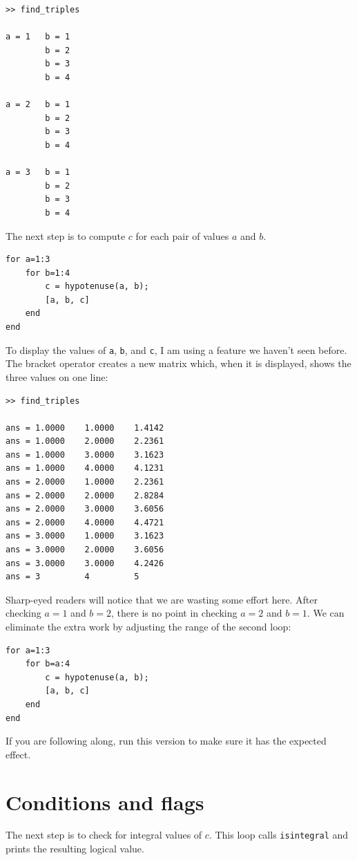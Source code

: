 \documentclass[
]{book}
\begin{document}
\begin{verbatim}
>> find_triples

a = 1   b = 1
        b = 2
        b = 3
        b = 4

a = 2   b = 1
        b = 2
        b = 3
        b = 4

a = 3   b = 1
        b = 2
        b = 3
        b = 4
\end{verbatim}

The next step is to compute $c$ for each pair of values $a$ and $b$.

\begin{verbatim}
for a=1:3
    for b=1:4
        c = hypotenuse(a, b);
        [a, b, c]
    end
end
\end{verbatim}

To display the values of {\tt a}, {\tt b}, and {\tt c}, I am
using a feature we haven't seen before.  The bracket operator
creates a new matrix which, when it is displayed, shows the
three values on one line:

\begin{verbatim}
>> find_triples

ans = 1.0000    1.0000    1.4142
ans = 1.0000    2.0000    2.2361
ans = 1.0000    3.0000    3.1623
ans = 1.0000    4.0000    4.1231
ans = 2.0000    1.0000    2.2361
ans = 2.0000    2.0000    2.8284
ans = 2.0000    3.0000    3.6056
ans = 2.0000    4.0000    4.4721
ans = 3.0000    1.0000    3.1623
ans = 3.0000    2.0000    3.6056
ans = 3.0000    3.0000    4.2426
ans = 3         4         5
\end{verbatim}

Sharp-eyed readers will notice that we are wasting some effort here.
After checking $a=1$ and $b=2$, there is no point in checking
$a=2$ and $b=1$.  We can eliminate the extra work by adjusting the
range of the second loop:

\begin{verbatim}
for a=1:3
    for b=a:4
        c = hypotenuse(a, b);
        [a, b, c]
    end
end
\end{verbatim}

If you are following along, run this version to make sure it has
the expected effect.


\section{Conditions and flags}

The next step is to check for integral values of $c$.  This
loop calls {\tt isintegral} and prints the resulting logical
value.
\end{document}
